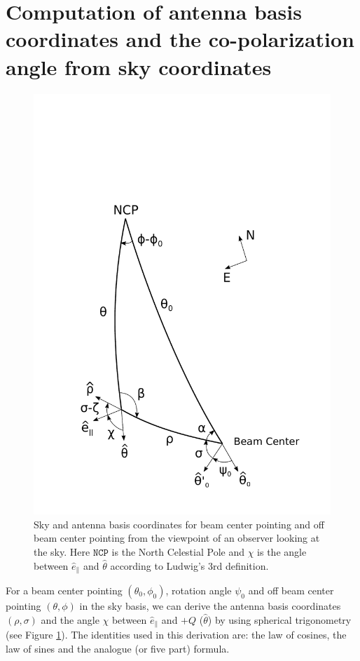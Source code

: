 \documentclass[a4paper,11pt]{article}
\newcommand{\co}{\mathbin{\|}}
\begin{document}
\section{Computation of antenna basis coordinates and the co-polarization angle from sky coordinates}
%
\begin{figure}
	\centering
	\includegraphics[width=0.6\linewidth]{figures/Figure10_Lu3.pdf}
	\caption{Sky and antenna basis coordinates for beam center pointing and off beam center pointing from the viewpoint of an observer looking at the sky. Here $\mathrm{\texttt{NCP}}$ is the 
		     North Celestial Pole and $\chi$ is the angle between $\hat{e}_{\co}$ and $\hat{\theta}$ according to Ludwig's 3rd definition. }
	\label{fig::figure10}
\end{figure}
%
For a beam center pointing $(\theta_0, \phi_0)$, rotation angle $\psi_0$ and off beam center pointing $(\theta, \phi)$ in the sky basis, we can derive the antenna basis coordinates $(\rho,\sigma)$ and the angle $\chi$ between $\hat{e}_{\co}$ and $+Q$ ($\hat{\theta}$) by using spherical trigonometry (see Figure \ref{fig::figure10}). The identities used in this derivation are: the law of cosines, the law of sines and the analogue (or five part) formula.
\end{document}
